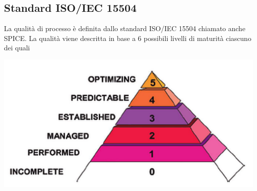 {  \subsection{Standard ISO/IEC 15504}


 La qualità di processo è definita dallo standard ISO/IEC 15504
 chiamato anche SPICE. 
 La qualità viene descritta in base a 6 possibili livelli di maturità
 ciascuno dei quali 





  \begin{center}
    \includegraphics[scale=1.3]{img/Iso15504.jpg}
  \end{center}



}
